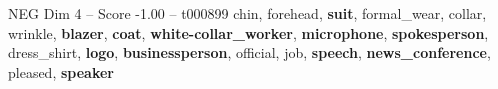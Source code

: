 \begin{textsample}{NEG Dim 4 – Score -1.00 – t000899}  \label{ex:f4_neg_005}
chin, forehead, \textbf{suit}, formal\_wear, collar, wrinkle, \textbf{blazer}, \textbf{coat}, \textbf{white-collar\_worker}, \textbf{microphone}, \textbf{spokesperson}, dress\_shirt, \textbf{logo}, \textbf{businessperson}, official, job, \textbf{speech}, \textbf{news\_conference}, pleased, \textbf{speaker}

\end{textsample}
